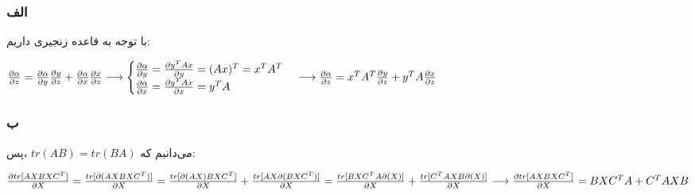 \subsubsection*{الف}{
با توجه به قاعده زنجیری داریم:

\setLTR
$
\frac{\partial \alpha}{\partial z} = \frac{\partial \alpha}{\partial y}\frac{\partial y}{\partial z} + \frac{\partial \alpha}{\partial x}\frac{\partial x}{\partial z}  \\ \\ \longrightarrow 
\begin{cases}
	\frac{\partial \alpha}{\partial y} = \frac{\partial y^TAx}{\partial y} = (Ax)^T = x^TA^T \\
	\frac{\partial \alpha}{\partial x} = \frac{\partial y^TAx}{\partial x} = y^TA
\end{cases} \longrightarrow
\frac{\partial \alpha}{\partial z} = x^TA^T\frac{\partial y}{\partial z}+y^TA\frac{\partial x}{\partial z}
$
\setRTL
}
\subsubsection*{ب}{
	می‌دانیم که $tr(AB) = tr(BA)$ ،پس:
	
\setLTR
$
\frac{\partial tr[AXBXC^T]}{\partial X} = \frac{ tr[\partial(AXBXC^T)]}{\partial X} =
\frac{ tr[\partial(AX)BXC^T]}{\partial X} + \frac{ tr[AX\partial(BXC^T)]}{\partial X} = \frac{ tr[BXC^TA\partial(X)]}{\partial X} + 
\frac{ tr[C^TAXB\partial(X)]}{\partial X} \\ \\ \longrightarrow
\frac{\partial tr[AXBXC^T]}{\partial X} = BXC^TA+C^TAXB
$
\setRTL
}